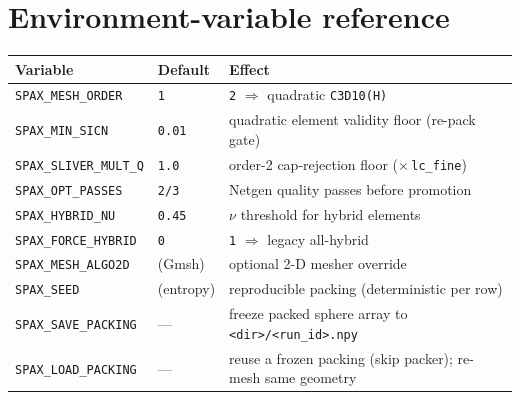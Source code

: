 \documentclass[11pt]{article}
\newcommand{\code}[1]{\texttt{\small #1}}
\newcommand{\env}[1]{\texttt{\small #1}}
\begin{document}
\section{Environment-variable reference}
\begin{table}[h]
\centering
\small
\begin{tabular}{@{}lll@{}}
\toprule
\textbf{Variable} & \textbf{Default} & \textbf{Effect}\\
\midrule
\env{SPAX\_MESH\_ORDER}     & \code{1} & \code{2} $\Rightarrow$ quadratic \code{C3D10(H)}\\
\env{SPAX\_MIN\_SICN}       & \code{0.01} & quadratic element validity floor (re-pack gate)\\
\env{SPAX\_SLIVER\_MULT\_Q} & \code{1.0} & order-2 cap-rejection floor ($\times$\,\code{lc\_fine})\\
\env{SPAX\_OPT\_PASSES}     & \code{2/3} & Netgen quality passes before promotion\\
\env{SPAX\_HYBRID\_NU}      & \code{0.45} & $\nu$ threshold for hybrid elements\\
\env{SPAX\_FORCE\_HYBRID}   & \code{0} & \code{1} $\Rightarrow$ legacy all-hybrid\\
\env{SPAX\_MESH\_ALGO2D}    & (Gmsh) & optional 2-D mesher override\\
\env{SPAX\_SEED}            & (entropy) & reproducible packing (deterministic per row)\\
\env{SPAX\_SAVE\_PACKING}   & --- & freeze packed sphere array to \code{<dir>/<run\_id>.npy}\\
\env{SPAX\_LOAD\_PACKING}   & --- & reuse a frozen packing (skip packer); re-mesh same geometry\\
\bottomrule
\end{tabular}
\end{table}

\end{document}
